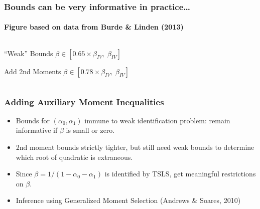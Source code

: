 \documentclass{beamer}
\begin{document}
\begin{frame}[c]
  \frametitle{Bounds can be very informative in practice\ldots}
  \framesubtitle{Figure based on data from Burde \& Linden (2013)}
\begin{columns}[c]
  \begin{column}{0.4\textwidth}
    \begin{block}{``Weak'' Bounds}
      $\beta \in [0.65 \times\beta_{IV},\; \beta_{IV}]$
    \end{block}
    \vspace{1em}
    \begin{alertblock}{Add 2nd Moments}
      $\beta \in [0.78 \times \beta_{IV},\;\beta_{IV}]$
    \end{alertblock}
  \end{column}
  \begin{column}{0.6\textwidth}
      \begin{figure}[h]
        \centering
      \end{figure}
  \end{column}
\end{columns}
 
\end{frame}
\begin{frame}
  \frametitle{Adding Auxiliary Moment Inequalities}

  \begin{itemize}
    \item Bounds for $(\alpha_0, \alpha_1)$ immune to weak identification problem: remain informative if $\beta$ is small or zero.
    \item 2nd moment bounds strictly tighter, but still need weak bounds to determine which root of  quadratic is extraneous.
    \item Since $\beta = 1/(1 - \alpha_0 - \alpha_1)$ is identified by TSLS, get meaningful restrictions on $\beta$.
    \item Inference using Generalized Moment Selection (Andrews \& Soares, 2010)
  \end{itemize}

  
\end{frame}
\end{document}
